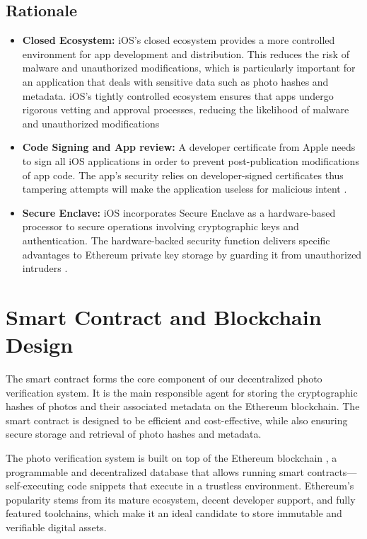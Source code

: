 \subsection{Rationale}
\begin{itemize}
    \item {\textbf{Closed Ecosystem:}} iOS's closed ecosystem provides a more controlled environment for app development and distribution. This reduces the risk of malware and unauthorized modifications, which is particularly important for an application that deals with sensitive data such as photo hashes and metadata. iOS’s tightly controlled ecosystem ensures that apps undergo rigorous vetting and approval processes, reducing the likelihood of malware and unauthorized modifications \cite{iosSecGarg}
    \item {\textbf{Code Signing and App review:}} A developer certificate from Apple needs to sign all iOS applications in order to prevent post-publication modifications of app code. The app's security relies on developer-signed certificates thus tampering attempts will make the application useless for malicious intent \cite{devCert}.
    \item {\textbf{Secure Enclave:}} iOS incorporates Secure Enclave as a hardware-based processor to secure operations involving cryptographic keys and authentication. The hardware-backed security function delivers specific advantages to Ethereum private key storage by guarding it from unauthorized intruders \cite{SecureEnclave2024}.
\end{itemize}


\section{Smart Contract and Blockchain Design}
The smart contract forms the core component of our decentralized photo verification system. It is the main responsible agent for storing the cryptographic hashes of photos and their associated metadata on the Ethereum blockchain. The smart contract is designed to be efficient and cost-effective, while also ensuring secure storage and retrieval of photo hashes and metadata.

The  photo verification system is built on top of the Ethereum blockchain \cite{ethereuem}, a programmable and decentralized database that allows running smart contracts—self-executing code snippets that execute in a trustless environment. Ethereum's popularity stems from its mature ecosystem, decent developer support, and fully featured toolchains, which make it an ideal candidate to store immutable and verifiable digital assets.

